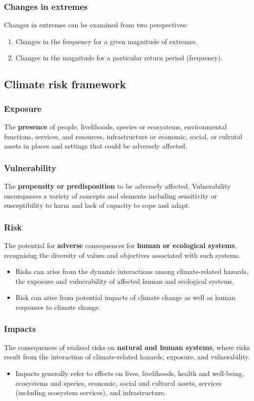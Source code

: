 \documentclass[11pt]{article}
\begin{document}
\subsubsection{Changes in extremes}
\label{sec:org81e51b8}
Changes in extremes can be examined from two perspectives:
\begin{enumerate}
\item Changes in the frequency for a given magnitude of extremes.
\item Changes in the magnitude for a particular return period (frequency).
\end{enumerate}
\subsection{Climate risk framework}
\label{sec:org5d74469}

\subsubsection{Exposure}
\label{sec:org295f0cd}
The \textbf{presence} of people, livelihoods, species or ecosystems, environmental functions, services, and resources, infrastructure or economic, social, or culrutal assets in places and settings that could be adversely affected.
\subsubsection{Vulnerability}
\label{sec:orge44b4b2}
The \textbf{propensity or predisposition} to be adversely affected. Vulnerability encompasses a variety of concepts and elements including sensitivity or susceptibility to harm and lack of capacity to cope and adapt.
\subsubsection{Risk}
\label{sec:org79fbd8a}
The potential for \textbf{adverse} consequences for \textbf{human or ecological systems}, recognising the diversity of values and objectives associated with such systems.
\begin{itemize}
\item Risks can arise from the dynamic interactions among climate-related hazards, the exposure and vulnerability of affected human and ecological systems.
\item Risk can arise from potential impacts of climate change as well as human responses to climate change.
\end{itemize}
\subsubsection{Impacts}
\label{sec:org6ee877a}
The consequences of realised risks on \textbf{natural and human systems}, where risks result from the interaction of climate-related hazards, exposure, and vulnerability.
\begin{itemize}
\item Impacts generally refer to effects on lives, livelihoods, health and well-being, ecosystems and species, economic, social and cultural assets, services (including ecosystem services), and infrastructure.
\end{itemize}
\end{document}
